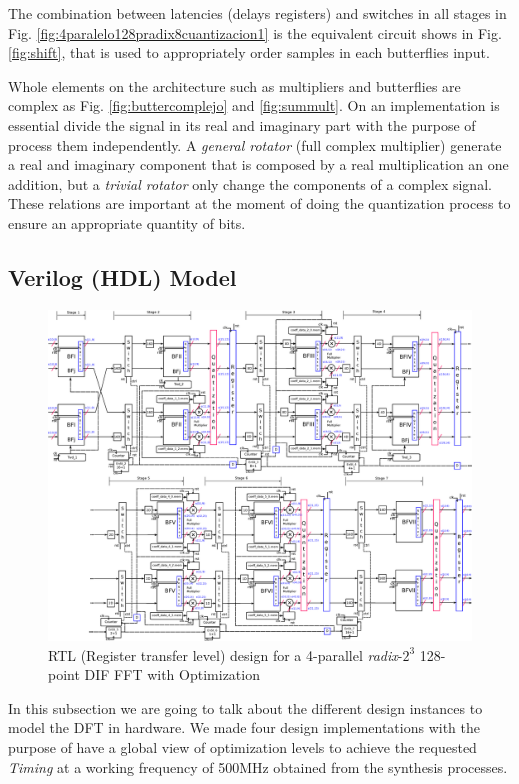 \documentclass[journal,comsoc]{IEEEtran}
\begin{document}
The combination between latencies (delays registers) and switches in all stages in Fig. \ref{fig:4paralelo128pradix8cuantizacion1} is the equivalent circuit shows in Fig. \ref{fig:shift}, that is used to appropriately order samples in each butterflies input.

Whole elements on the architecture such as multipliers and butterflies are complex as Fig. \ref{fig:buttercomplejo} and \ref{fig:summult}. On an implementation is essential divide the signal in its real and imaginary part with the purpose of process them independently. A \textit{general rotator} (full complex multiplier) generate a real and imaginary component that is composed by a real multiplication an one addition, but a \textit{trivial rotator} only change the components of a complex signal. These relations are important at the moment of doing the quantization process to ensure an appropriate quantity of bits.
\subsection{Verilog (HDL) Model} 
\begin{figure}[t!]
	\centering
	\includegraphics[width=\linewidth]{Diagramas/V5_esquema_p.eps}
	\caption{RTL (Register transfer level) design for a 4-parallel \textit{radix}-$2^3$ 128-point DIF FFT with Optimization}
	\label{fig:v5esquemap}
\end{figure}

In this subsection we are going to talk about the different design instances to model the DFT in hardware. 
We made four design implementations with the purpose of have a global view of optimization levels to achieve the requested \textit{Timing} at a working frequency of 500MHz obtained from the synthesis processes.
\end{document}
